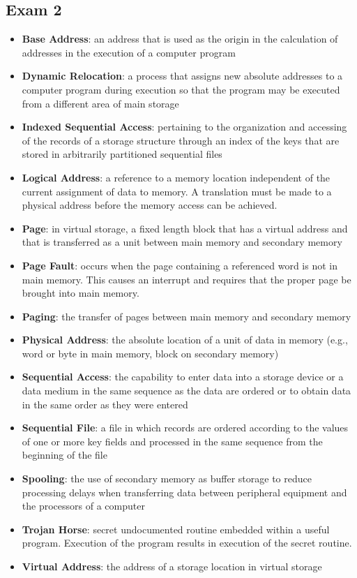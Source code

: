 \documentclass[fontsize=5pt]{scrartcl}
\begin{document}
\begin{multicols}{3}
    \subsection{Exam 2}
      \begin{itemize}
         \item \textbf{Base Address}: an address that is used as the origin in the calculation of addresses in the execution of a computer program
         \item \textbf{Dynamic Relocation}: a process that assigns new absolute addresses to a computer program during execution so that the program may be executed from a different area of main storage
         \item \textbf{Indexed Sequential Access}: pertaining to the organization and accessing of the records of a storage structure through an index of the keys that are stored in arbitrarily partitioned sequential files
         \item \textbf{Logical Address}: a reference to a memory location independent of the current assignment of data to memory.  A translation must be made to a physical address before the memory access can be achieved.
         \item \textbf{Page}: in virtual storage, a fixed length block that has a virtual address and that is transferred as a unit between main memory and secondary memory
         \item \textbf{Page Fault}: occurs when the page containing a referenced word is not in main memory.  This causes an interrupt and requires that the proper page be brought into main memory.
         \item \textbf{Paging}: the transfer of pages between main memory and secondary memory
         \item \textbf{Physical Address}: the absolute location of a unit of data in memory (e.g., word or byte in main memory, block on secondary memory)
         \item \textbf{Sequential Access}: the capability to enter data into a storage device or a data medium in the same sequence as the data are ordered or to obtain data in the same order as they were entered
         \item \textbf{Sequential File}: a file in which records are ordered according to the values of one or more key fields and processed in the same sequence from the beginning of the file
         \item \textbf{Spooling}: the use of secondary memory as buffer storage to reduce processing delays when transferring data between peripheral equipment and the processors of a computer
         \item \textbf{Trojan Horse}: secret undocumented routine embedded within a useful program.  Execution of the program results in execution of the secret routine.
         \item \textbf{Virtual Address}: the address of a storage location in virtual storage 
      \end{itemize}
    

\end{multicols}
\end{document}
